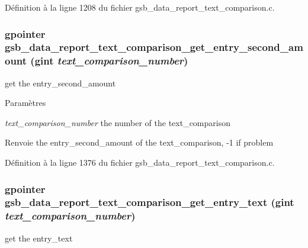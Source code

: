 Définition à la ligne 1208 du fichier gsb\_\-data\_\-report\_\-text\_\-comparison.c.

\subsubsection[{gsb\_\-data\_\-report\_\-text\_\-comparison\_\-get\_\-entry\_\-second\_\-amount}]{\setlength{\rightskip}{0pt plus 5cm}gpointer gsb\_\-data\_\-report\_\-text\_\-comparison\_\-get\_\-entry\_\-second\_\-amount (gint {\em text\_\-comparison\_\-number})}\label{gsb__data__report__text__comparison_8h_a171d77b0c4ab46cd9a2468dc815da11a}
get the entry\_\-second\_\-amount


\begin{DoxyParams}{Paramètres}
\item[{\em text\_\-comparison\_\-number}]the number of the text\_\-comparison\end{DoxyParams}
\begin{DoxyReturn}{Renvoie}
the entry\_\-second\_\-amount of the text\_\-comparison, -\/1 if problem 
\end{DoxyReturn}


Définition à la ligne 1376 du fichier gsb\_\-data\_\-report\_\-text\_\-comparison.c.

\subsubsection[{gsb\_\-data\_\-report\_\-text\_\-comparison\_\-get\_\-entry\_\-text}]{\setlength{\rightskip}{0pt plus 5cm}gpointer gsb\_\-data\_\-report\_\-text\_\-comparison\_\-get\_\-entry\_\-text (gint {\em text\_\-comparison\_\-number})}\label{gsb__data__report__text__comparison_8h_a9127cedf50ca4d5230e9c69c833a1e87}
get the entry\_\-text


